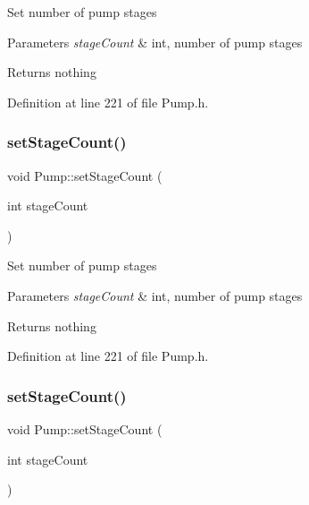 Set number of pump stages


\begin{DoxyParams}{Parameters}
{\em stage\+Count} & int, number of pump stages\\
\hline
\end{DoxyParams}
\begin{DoxyReturn}{Returns}
nothing 
\end{DoxyReturn}


Definition at line 221 of file Pump.\+h.

\mbox{\label{class_pump_a28943405616a792c970b7e9bbf01c1b2}} 
\subsubsection{\texorpdfstring{set\+Stage\+Count()}{setStageCount()}\hspace{0.1cm}{\footnotesize\ttfamily [2/3]}}
{\footnotesize\ttfamily void Pump\+::set\+Stage\+Count (\begin{DoxyParamCaption}\item[{int}]{stage\+Count }\end{DoxyParamCaption})\hspace{0.3cm}{\ttfamily [inline]}}

Set number of pump stages


\begin{DoxyParams}{Parameters}
{\em stage\+Count} & int, number of pump stages\\
\hline
\end{DoxyParams}
\begin{DoxyReturn}{Returns}
nothing 
\end{DoxyReturn}


Definition at line 221 of file Pump.\+h.

\mbox{\label{class_pump_a28943405616a792c970b7e9bbf01c1b2}} 
\subsubsection{\texorpdfstring{set\+Stage\+Count()}{setStageCount()}\hspace{0.1cm}{\footnotesize\ttfamily [3/3]}}
{\footnotesize\ttfamily void Pump\+::set\+Stage\+Count (\begin{DoxyParamCaption}\item[{int}]{stage\+Count }\end{DoxyParamCaption})\hspace{0.3cm}{\ttfamily [inline]}}

